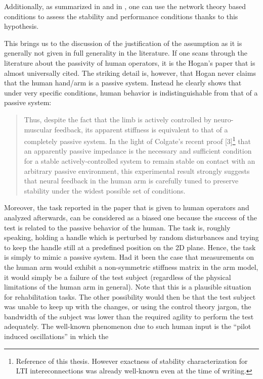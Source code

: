 Additionally, as summarized in  and in , one can use the 
network theory based conditions to assess the stability and performance conditions thanks to this hypothesis.

This brings us to the discussion of the justification of the assumption as it is generally not given in full generality in the
literature. If one scans through the literature about the passivity of human operators, it is the Hogan's paper \cite{hogan89}
that is almost universally cited. The striking detail is, however, that Hogan never claims that the human hand/arm is a passive
system. Instead he clearly shows that under very specific conditions, human behavior is indistinguishable from that of a 
passive system: 
\begin{quote}
Thus, despite the fact that the
limb is actively controlled by neuro-muscular feedback, its apparent stiffness is equivalent to that of a completely passive
system. In the light of Colgate's recent proof [3]\footnote{Reference \cite{colgatehogan88} of this thesis. However exactness 
of stability characterization for LTI intereconnections was already well-known even at the time of writing.} that an apparently 
passive impedance is the necessary and sufficient condition for a stable actively-controlled system to remain stable on contact 
with an arbitrary passive environment, this experimental result strongly suggests that neural feedback in the human arm is carefully 
tuned to preserve stability under the widest possible set of conditions.
\end{quote}
Moreover, the task reported in the paper that is given to human operators and analyzed afterwards, can be considered as a biased one because the success 
of the test is related to the passive behavior of the human. The task is, roughly speaking, holding a handle which is perturbed by 
random disturbances and trying to keep the handle still at a predefined position on the 2D plane. Hence, the task is simply to mimic 
a passive system. Had it been the case that measurements on the human arm would exhibit a non-symmetric stiffness matrix in the arm 
model, it would simply be a failure of the test subject (regardless of the physical limitations of the human arm in general). Note 
that this is a plausible situation for rehabilitation tasks. The other possibility would then be that the test subject was unable 
to keep up with the changes, or using the control theory jargon, the bandwidth of the subject was lower than the required agility to 
perform the test adequately. The well-known phenomenon due to such human input is the \enquote{pilot induced oscillations} in which the 

